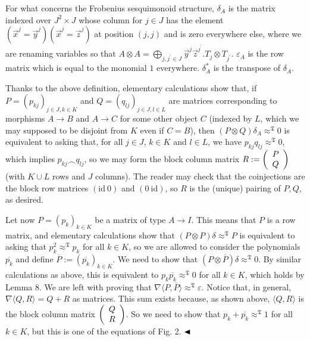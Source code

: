  
 
For what concerns the Frobenius sesquimonoid structure, $\delta_{A}$ is the matrix indexed over $J^{2}\times J$ whose column for $j\in J$ has the element $(\vec{x}^{j}=\vec{y}^{j})(\vec{x}^{j}=\vec{z}^{j})$ at position $(j,j)$ and is zero everywhere else, where we are renaming variables so that $A\otimes A=\bigoplus_{j,j^{\prime}\in J}\vec{y}^{j}\vec{z}^{j^{\prime}}.T_{j}%
\otimes T_{j^{\prime}}$. $\varepsilon_{A}$ is the row matrix which is equal to the monomial $1$ everywhere. $\delta^{\ast}_{A}$ is the transpose of $\delta_{A}$.\par
 
 
 
Thanks to the above definition, elementary calculations show that, if $P=(p_{kj})_{j\in J,k\in K}$ and $Q=(q_{lj})_{j\in J,l\in L}$ are matrices corresponding to morphisms $A\to B$ and $A\to C$ for some other object $C$ (indexed by $L$, which we may supposed to be disjoint from $K$ even if $C=B$), then $(P\otimes Q)\delta_{A}\approx^{\mathfrak{T}}0$ is equivalent to asking that, for all $j\in J$, $k\in K$ and $l\in L$, we have $p_{kj}q_{lj}\approx^{\mathfrak{T}}0$, which implies $p_{kj}\frown q_{lj}$, so we may form the block column matrix $R:=\left(\begin{array}[]{c}P\\
Q\end{array}\right)$ (with $K\cup L$ rows and $J$ columns). The reader may check that the coinjections are the block row matrices $(\mathrm{id}\ 0)$ and $(0\ \mathrm{id})$, so $R$ is the (unique) pairing of $P,Q$, as desired.\par
 
 
 
Let now $P=(p_{k})_{k\in K}$ be a matrix of type $A\to I$. This means that $P$ is a row matrix, and elementary calculations show that $(P\otimes P)\delta\approx^{\mathfrak{T}}P$ is equivalent to asking that $p_{k}^{2}\approx^{\mathfrak{T}}p_{k}$ for all $k\in K$, so we are allowed to consider the polynomials $\overline{p_{k}}$ and define $\overline{P}:=(\overline{p_{k}})_{k\in K}$. We need to show that $(P\otimes\overline{P})\delta\approx^{\mathfrak{T}}0$. By similar calculations as above, this is equivalent to $p_{k}\overline{p_{k}}\approx^{\mathfrak{T}}0$ for all $k\in K$, which holds by Lemma 8. We are left with proving that $\nabla\langle P,\overline{P}\rangle\approx^{\mathfrak{T}}\varepsilon$. Notice that, in general, $\nabla\langle Q,R\rangle=Q+R$ as matrices. This sum exists because, as shown above, $\langle Q,R\rangle$ is the block column matrix $\left(\begin{array}[]{c}Q\\
R\end{array}\right)$. So we need to show that $p_{k}+\overline{p_{k}}\approx^{\mathfrak{T}}1$ for all $k\in K$, but this is one of the equations of Fig. 2. $\hfill\blacktriangleleft$\par
 
